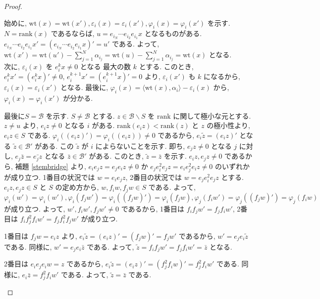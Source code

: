 \documentclass[
  a4paper, 
  12pt,
  ja=standard,
  xelatex,
  left=30truemm,
  right=30truemm,
  titlepage 
]{bxjsarticle}
\theoremstyle{definition}
\begin{document}
\begin{proof}
\begin{enumerate}
    始めに, $\mathrm{wt}(x) = \mathrm{wt}(x'), \varepsilon_i(x) = \varepsilon_i(x'),
    \varphi_i(x) = \varphi_i(x')$ を示す.
    $N = \mathrm{rank}(x)$ であるならば, $u = e_{i_N} \cdots e_{i_2}e_{i_1} x$ となるものがある.
    $e_{i_N} \cdots e_{i_2}e_{i_1} x' = (e_{i_N} \cdots e_{i_2}e_{i_1} x)' = u'$ である.
    よって, 
    $
    \mathrm{wt}(x') = \mathrm{wt}(u') - \sum_{j = 1}^{N} \alpha_{i_j}
    = \mathrm{wt}(u) - \sum_{j = 1}^{N} \alpha_{i_j} = \mathrm{wt}(x)
    $
    となる. \\
    次に, $\varepsilon_i(x)$ を $e_i^k x \neq 0$ となる 最大の数 $k$ とする.
    このとき, $e_i^kx' = (e_i^kx)' \neq 0$, $e_i^{k + 1}x' = (e_i^{k + 1}x)' = 0$
    より, $\varepsilon_i(x')$ も $k$ になるから, $\varepsilon_i(x) = \varepsilon_i(x')$ となる.
    最後に, $\varphi_i(x) = \langle \mathrm{wt}(x), \alpha_i \rangle - \varepsilon_i(x)$
    から, $\varphi_i(x) = \varphi_i(x')$ が分かる.

    最後に$S = \mathcal{B}$ を示す. $S \neq \mathcal{B}$ とする.
    $ z \in \mathcal{B} \backslash S$ を $\mathrm{rank}$ に関して極小な元とする.
    $z \neq u$ より, $e_iz \neq 0$ となる $i$ がある.
    $\mathrm{rank}(e_iz) < \mathrm{rank}(z)$ と $z$ の極小性より, $e_iz \in S$ である.
    $\varphi_i((e_iz)') = \varphi_i((e_iz)) \neq 0$ であるから,
    $e_i \tilde{z} = (e_iz)'$ となる $\tilde{z} \in \mathcal{B}'$ がある.
    この $\tilde{z}$ が $i$ によらないことを示す.
    即ち, $e_jz \neq 0$ となる $j$ に対し, $e_j \bar{z} = \bar{e_jz}$ となる
    $ \bar{z} \in \mathcal{B}'$ がある. このとき, $\tilde{z} = \bar{z}$ を示す.
    $e_i z, e_j z \neq 0$ であるから, 補題 \ref{stembridge} より,
    $e_ie_j z = e_je_i z \neq 0$ か $e_je_i^2e_j z = e_ie_j^2e_i z \neq 0$
    のいずれかが成り立つ.
    1番目の状況では $w = e_ie_j z$, 2番目の状況では $w = e_je_i^2e_j z$ とする.
    $e_i z, e_j z \in S$ と $S$ の定め方から, $w, f_iw, f_jw \in S$ である.
    よって, 
    $\varphi_i(w') = \varphi_i(w'), \varphi_i(f_jw') = \varphi_i((f_jw)') = \varphi_i(f_jw),
    \varphi_j(f_iw') = \varphi_j((f_jw)') = \varphi_j(f_iw)$
    が成り立つ.
    よって, $w', f_iw', f_jw' \neq 0$ であるから,
    1番目は $f_if_jw' = f_jf_iw'$, 2番目は $f_if_j^2f_iw' = f_jf_i^2f_jw'$
    が成り立つ.

    1番目は $f_jw = e_iz$ より, $e_i \tilde{z} = (e_iz)' = (f_jw)' = f_jw'$ であるから,
    $w' = e_je_i \tilde{z}$ である. 同様に, $w' = e_je_i \bar{z}$ である.
    よって, $\tilde{z} = f_if_jw' = f_jf_iw' = \bar{z}$ となる.

    2番目は $e_ie_je_iw = z$ であるから, 
    $e_i \tilde{z} = (e_iz)' = (f_j^2f_iw)' = f_j^2f_iw'$ である.
    同様に, $e_i \bar{z} = f_j^2f_iw'$ である.
    よって, $\tilde{z} = \bar{z}$ である.


\end{enumerate}
\end{proof}
\end{document}

